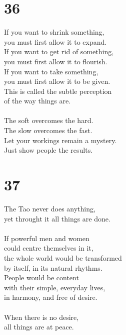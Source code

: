\documentclass[b5paper, 12pt, oneside]{book}
\begin{document}
\chapter*{36}
If you want to shrink something,\\
you must first allow it to expand.\\
If you want to get rid of something,\\
you must first allow it to flourish.\\
If you want to take something,\\
you must first allow it to be given.\\
This is called the subtle perception\\
of the way things are.\\
\\
The soft overcomes the hard.\\
The slow overcomes the fast.\\
Let your workings remain a mystery.\\
Just show people the results.\\

\chapter*{37}
The Tao never does anything,\\
yet throught it all things are done.\\
\\
If powerful men and women\\
could centre themselves in it,\\
the whole world would be transformed\\
by itself, in its natural rhythms.\\
People would be content\\
with their simple, everyday lives,\\
in harmony, and free of desire.\\
\\
When there is no desire,\\
all things are at peace.\\
\end{document}
